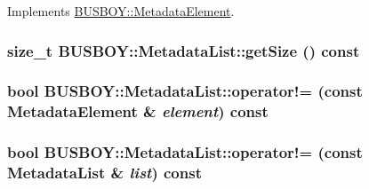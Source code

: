 Implements \hyperlink{classBUSBOY_1_1MetadataElement_a048a64f1d70affc5bfdd78a9958c5fb9}{BUSBOY::MetadataElement}.\hypertarget{classBUSBOY_1_1MetadataList_a406622e64ad69a0be0d217dc98841d8a}{
\subsubsection[{getSize}]{\setlength{\rightskip}{0pt plus 5cm}size\_\-t BUSBOY::MetadataList::getSize () const}}
\label{classBUSBOY_1_1MetadataList_a406622e64ad69a0be0d217dc98841d8a}
\hypertarget{classBUSBOY_1_1MetadataList_a1cc8b9cc195397c871a183a2496dc493}{
\subsubsection[{operator!=}]{\setlength{\rightskip}{0pt plus 5cm}bool BUSBOY::MetadataList::operator!= (const {\bf MetadataElement} \& {\em element}) const}}
\label{classBUSBOY_1_1MetadataList_a1cc8b9cc195397c871a183a2496dc493}
\hypertarget{classBUSBOY_1_1MetadataList_a224d6c162a01e42b6262335a9ef139dd}{
\subsubsection[{operator!=}]{\setlength{\rightskip}{0pt plus 5cm}bool BUSBOY::MetadataList::operator!= (const {\bf MetadataList} \& {\em list}) const}}
\label{classBUSBOY_1_1MetadataList_a224d6c162a01e42b6262335a9ef139dd}


